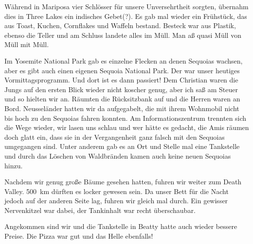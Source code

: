 Während in Mariposa vier Schlösser für unsere Unversehrtheit sorgten, übernahm dies in Three Lakes ein indisches Gebet(?).
Es gab mal wieder ein Frühstück, das aus Toast, Kuchen, Cornflakes und Waffeln bestand.
Besteck war aus Plastik, ebenso die Teller und am Schluss landete alles im Müll.
Man aß quasi Müll von Müll mit Müll.

Im Yosemite National Park gab es einzelne Flecken an denen Sequoias wachsen, aber es gibt auch einen eigenen Sequoia National Park.
Der war unser heutiges Vormittagsprogramm.
Und dort ist es dann passiert!
Dem Christian waren die Jungs auf den ersten Blick wieder nicht koscher genug, aber ich saß am Steuer und so hielten wir an.
Räumten die Rücksitzbank auf und die Herren waren an Bord.
Neusseländer hatten wir da aufgegabelt, die mit ihrem Wohnmobil nicht bis hoch zu den Sequoias fahren konnten.
Am Informationszentrum trennten sich die Wege wieder, wir lasen uns schlau und wer hätte es gedacht, die Amis räumen doch glatt ein, dass sie in der Vergangenheit ganz falsch mit den Sequoias umgegangen sind.
Unter anderem gab es an Ort und Stelle mal eine Tankstelle und durch das Löschen von Waldbränden kamen auch keine neuen Sequoias hinzu.

Nachdem wir genug große Bäume gesehen hatten, fuhren wir weiter zum Death Valley.
500~km dürften es locker gewesen sein.
Da unser Bett für die Nacht jedoch auf der anderen Seite lag, fuhren wir gleich mal durch.
Ein gewisser Nervenkitzel war dabei, der Tankinhalt war recht überschaubar.

Angekommen sind wir und die Tankstelle in Beatty hatte auch wieder bessere Preise.
Die Pizza war gut und das Helle ebenfalls!
